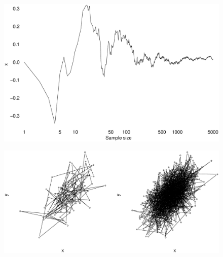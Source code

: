 \documentclass{beamer}
\begin{document}
\begin{frame}
  \begin{figure}
    \includegraphics[scale=.3]{gibbs1.eps}
  \end{figure}
\end{frame}

\begin{frame}
  \begin{figure}
    \includegraphics[scale=.3]{gibbs2.eps}
  \end{figure}
\end{frame}

\end{document}
